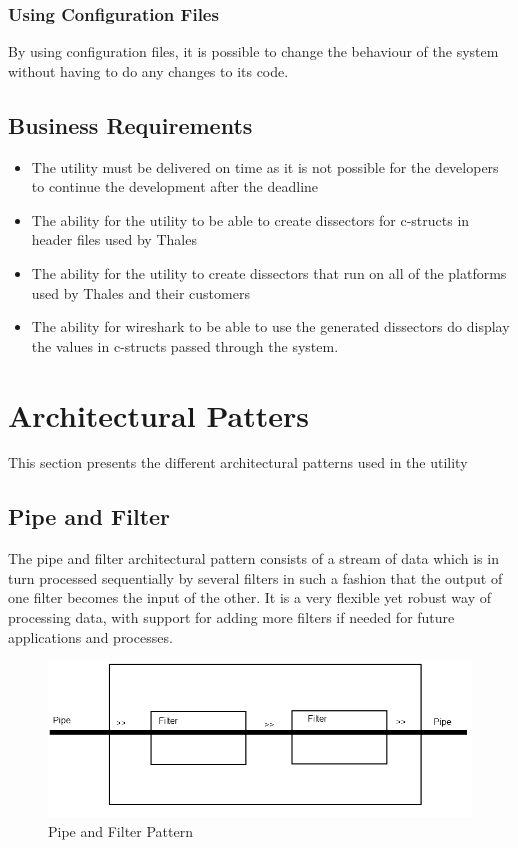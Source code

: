 \subsubsection{Using Configuration Files}
By using configuration files, it is possible to change the behaviour of the system without having to do any changes to its code.

\subsection{Business Requirements}
\begin{itemize}
\item The utility must be delivered on time as it is not possible for the developers to continue the development after the deadline
\item The ability for the utility to be able to create dissectors for c-structs in header files used by Thales
\item The ability for the utility to create dissectors that run on all of the platforms used by Thales and their customers
\item The ability for wireshark to be able to use the generated dissectors do display the values in c-structs passed through the system.
\end{itemize}


\section{Architectural Patters}
This section presents the different architectural patterns used in the utility

\subsection{Pipe and Filter}
The pipe and filter architectural pattern consists of a stream of data which is in turn processed sequentially by several filters in such a fashion that the output of one filter becomes the input of the other. It is a very flexible yet robust way of processing data, with support for adding more filters if needed for future applications and processes.

\begin{figure}[htb]
	\includegraphics[width=\textwidth]{./planning/img/PipeAndFilter}
	\caption{Pipe and Filter Pattern\label{fig:pipefilter}}
\end{figure}


